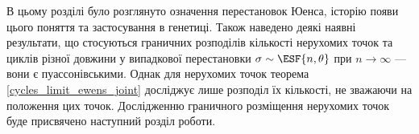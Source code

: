В цьому розділі було розглянуто означення
перестановок Юенса, історію появи цього поняття
та застосування в генетиці.
Також наведено деякі наявні результати,
що стосуються граничних розподілів кількості
нерухомих точок та циклів різної довжини
у випадкової перестановки $\sigma \sim \ESF{n, \theta}$
при $n \to \infty$ --- вони є пуассонівськими.
Однак для нерухомих точок теорема \ref{cycles_limit_ewens_joint}
досліджує лише розподіл їх кількості, не зважаючи
на положення цих точок. Дослідженню граничного розміщення
нерухомих точок буде присвячено наступний розділ роботи.